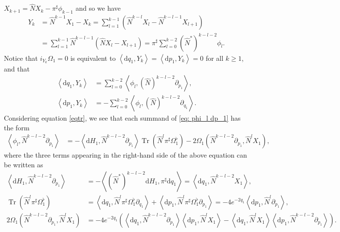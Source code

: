 \documentclass[12pt]{article}
\def\d{{\mathrm d}}
\def\Tr{\operatorname{Tr}}
\begin{document}
$X_{k+1}=\widehat{N}X_k-\pi^{\sharp}\phi_{k-1}$ and so we have %
\begin{align*}
Y_k&=\widehat{N}^{k-1}X_1-X_k=\sum_{l=1}^{k-1}\left(\widehat{N}^{k-l}X_l-\widehat{N}^{k-l-1}X_{l+1}\right)\\
&=\sum_{l=1}^{k-1}\widehat{N}^{k-l-1}\left(\widehat{N}X_l-X_{l+1}\right)=\pi^{\sharp}\sum_{l=0}^{k-2}\left(\widehat{N}^*\right)^{k-l-2}\phi_l.
\end{align*}
Notice that $i_{Y_k}\Omega_1=0$ is equivalent to $\left<\d q_1,Y_k\right>=\left<\d p_1,Y_k\right>=0$ for all $k\geq 1$, and that
\begin{align}
\left<\d q_1,Y_k\right>&=\sum_{l=0}^{k-2}\left<\phi_l,\left(\widehat{N}\right)^{k-l-2}\partial_{p_1}\right>\label{eq: phi_l dp_1},
\\ %
\left<\d p_1,Y_k\right>&=-\sum_{l=0}^{k-2}\left<\phi_l,\left(\widehat{N}\right)^{k-l-2}\partial_{q_1}\right>\label{eq: phi_l dq_1}. %
\end{align}
Considering equation \eqref{eqtr}, we see that each summand of \eqref{eq: phi_l dp_1} has the form
\begin{align*}
\left<\phi_l,\widehat{N}^{k-l-2}\partial_{p_1}\right>
&=-\left<\d H_1,\widehat{N}^{k-l-2}\partial_{p_1}\right>\Tr\left(\widehat{N}^l\pi^{\sharp}\Omega_1^{\flat}\right)-2\Omega_1\left(\widehat{N}^{k-l-2}\partial_{p_1},\widehat{N}^{l}X_1\right),
\end{align*}
where %
the three terms appearing in the right-hand side of the above equation can be written as
\begin{align*}
\left<\d H_1,\widehat{N}^{k-l-2}\partial_{p_1}\right>
&=-\left<\left(\widehat{N}^*\right)^{k-l-2}\d H_1,\pi^{\sharp}\d q_1\right>=\left<\d q_1,\widehat{N}^{k-l-2}X_1\right>,\\
\Tr\left(\widehat{N}^l\pi^{\sharp}\Omega_1^{\flat}\right)
&=\left<\d q_1,\widehat{N}^{l}\pi^{\sharp}\Omega_1^{\flat}\partial _{q_1}\right>+\left<\d p_1,\widehat{N}^{l}\pi^{\sharp}\Omega_1^{\flat}\partial_{p_1}\right>=-4e^{-2q_1}\left<\d p_1,\widehat{N}^l\partial_{p_1}\right>,\\
2\Omega_1\left(\widehat{N}^{k-l-2}\partial_{p_1},\widehat{N}^lX_1\right)  &=-4e^{-2q_1}\left(\left<\d q_1,\widehat{N}^{k-l-2}\partial_{p_1}\right>\left<\d p_1,\widehat{N}^{l}X_1\right>-\left<\d q_1,\widehat{N}^lX_1\right>\left<\d p_1,\widehat{N}^{k-l-2}\partial_{p_1}\right>\right).  
\end{align*}
\end{document}
